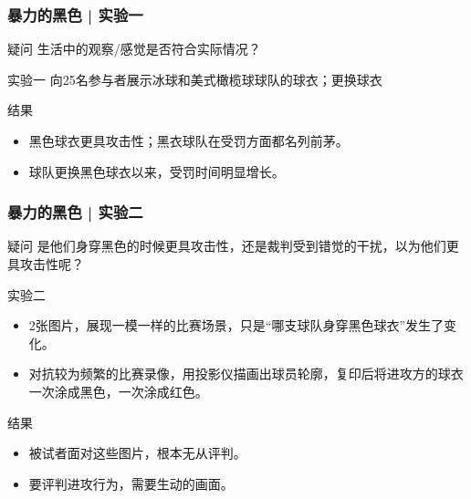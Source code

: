 \begin{frame}
  \frametitle{暴力的黑色 | 实验一}
  \begin{block}{疑问}
      生活中的观察/感觉是否符合实际情况？
  \end{block}
  \pause
  \begin{block}{实验一}
      向25名参与者展示冰球和美式橄榄球球队的球衣；更换球衣
  \end{block}
  \vspace{-0.5em}
  \pause
  \begin{block}{结果}
    \begin{itemize}
      \item 黑色球衣更具攻击性；黑衣球队在受罚方面都名列前茅。
      \item 球队更换黑色球衣以来，受罚时间明显增长。
    \end{itemize}
  \end{block}
\end{frame}

\begin{frame}
  \frametitle{暴力的黑色 | 实验二}
  \begin{block}{疑问}
    是他们身穿黑色的时候更具攻击性，还是裁判受到错觉的干扰，以为他们更具攻击性呢？
  \end{block}
  \pause
  \begin{block}{实验二}
    \begin{itemize}
      \item 2张图片，展现一模一样的比赛场景，只是“哪支球队身穿黑色球衣”发生了变化。
      \item 对抗较为频繁的比赛录像，用投影仪描画出球员轮廓，复印后将进攻方的球衣一次涂成黑色，一次涂成红色。
    \end{itemize}
  \end{block}
  \pause
  \begin{block}{结果}
    \begin{itemize}
      \item 被试者面对这些图片，根本无从评判。
      \item 要评判进攻行为，需要生动的画面。
    \end{itemize}
  \end{block}
\end{frame}

